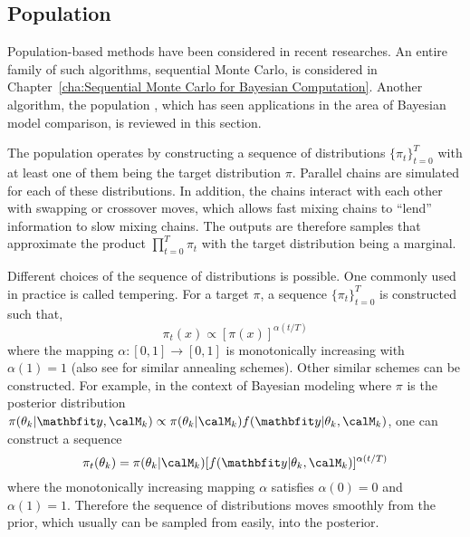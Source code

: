 \subsection{Population \protect\mcmc}
\label{sub:Population mcmc}

Population-based methods have been considered in recent researches. An entire
family of such algorithms, sequential Monte Carlo, is considered in
Chapter~\ref{cha:Sequential Monte Carlo for Bayesian Computation}. Another
algorithm, the population \mcmc, which has seen applications in the area of
Bayesian model comparison, is reviewed in this section.

The population \mcmc operates by constructing a sequence of distributions
$\{\pi_t\}_{t=0}^T$ with at least one of them being the target distribution
$\pi$. Parallel \mcmc chains are simulated for each of these distributions. In
addition, the chains interact with each other with swapping or crossover
moves, which allows fast mixing chains to ``lend'' information to slow mixing
chains. The outputs are therefore samples that approximate the product
$\prod_{t=0}^T\pi_t$ with the target distribution being a marginal.

Different choices of the sequence of distributions is possible. One commonly
used in practice is called tempering. For a target $\pi$, a sequence
$\{\pi_t\}_{t=0}^T$ is constructed such that,
\begin{equation}
  \pi_t(x) \propto [\pi(x)]^{\alpha(t/T)}
\end{equation}
where the mapping $\alpha:[0,1]\to[0,1]$ is monotonically increasing with
$\alpha(1) = 1$ (also see \cite{Marinari:1992vx} for similar annealing
schemes). Other similar schemes can be constructed. For example, in the
context of Bayesian modeling where $\pi$ is the posterior distribution
$\pi(\theta_k|\data,\calM_k) \propto
\pi(\theta_k|\calM_k)f(\data|\theta_k,\calM_k)$, one can construct a sequence
\begin{equation}
  \pi_t(\theta_k) =
  \pi(\theta_k|\calM_k)[f(\data|\theta_k,\calM_k)]^{\alpha(t/T)}
  \label{eq:power post}
\end{equation}
where the monotonically increasing mapping $\alpha$ satisfies $\alpha(0) = 0$
and $\alpha(1) = 1$. Therefore the sequence of distributions moves smoothly
from the prior, which usually can be sampled from easily, into the posterior.

